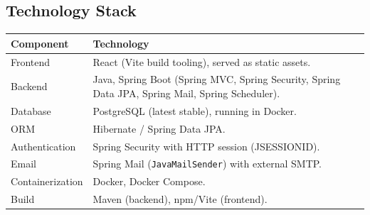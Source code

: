 \documentclass[11pt,a4paper]{article}
\begin{document}
\subsection{Technology Stack}

\begin{longtable}{p{3.5cm} p{10cm}}
\toprule
\textbf{Component} & \textbf{Technology} \\
\midrule
Frontend & React (Vite build tooling), served as static assets. \\
Backend & Java, Spring Boot (Spring MVC, Spring Security, Spring Data JPA, Spring Mail, Spring Scheduler). \\
Database & PostgreSQL (latest stable), running in Docker. \\
ORM & Hibernate / Spring Data JPA. \\
Authentication & Spring Security with HTTP session (JSESSIONID). \\
Email & Spring Mail (\texttt{JavaMailSender}) with external SMTP. \\
Containerization & Docker, Docker Compose. \\
Build & Maven (backend), npm/Vite (frontend). \\
\bottomrule
\end{longtable}
\end{document}
